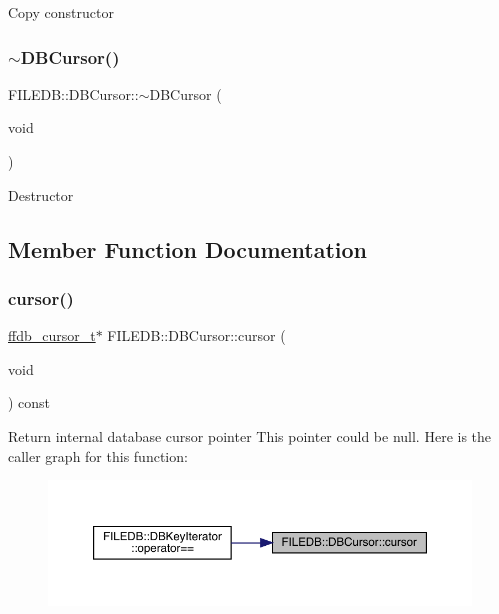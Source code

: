 Copy constructor \mbox{\label{classFILEDB_1_1DBCursor_a8c6c1bdf4c4279ab3e0d980e800c3542}} 
\subsubsection{\texorpdfstring{$\sim$DBCursor()}{~DBCursor()}\hspace{0.1cm}{\footnotesize\ttfamily [3/3]}}
{\footnotesize\ttfamily F\+I\+L\+E\+D\+B\+::\+D\+B\+Cursor\+::$\sim$\+D\+B\+Cursor (\begin{DoxyParamCaption}\item[{void}]{ }\end{DoxyParamCaption})}

Destructor 

\subsection{Member Function Documentation}
\mbox{\label{classFILEDB_1_1DBCursor_a9e5b4a386c6f27bc1eb67714117e1e6d}} 
\subsubsection{\texorpdfstring{cursor()}{cursor()}\hspace{0.1cm}{\footnotesize\ttfamily [1/3]}}
{\footnotesize\ttfamily \mbox{\hyperlink{adat-devel_2other__libs_2filedb_2filehash_2ffdb__db_8h_a1383f6fb3966b0ca74206ba93b687fd9}{ffdb\+\_\+cursor\+\_\+t}}$\ast$ F\+I\+L\+E\+D\+B\+::\+D\+B\+Cursor\+::cursor (\begin{DoxyParamCaption}\item[{void}]{ }\end{DoxyParamCaption}) const\hspace{0.3cm}{\ttfamily [inline]}}

Return internal database cursor pointer This pointer could be null. Here is the caller graph for this function\+:
\nopagebreak
\begin{figure}[H]
\begin{center}
\leavevmode
\includegraphics[width=350pt]{d2/d46/classFILEDB_1_1DBCursor_a9e5b4a386c6f27bc1eb67714117e1e6d_icgraph}
\end{center}
\end{figure}
\mbox{\label{classFILEDB_1_1DBCursor_a9e5b4a386c6f27bc1eb67714117e1e6d}} 

